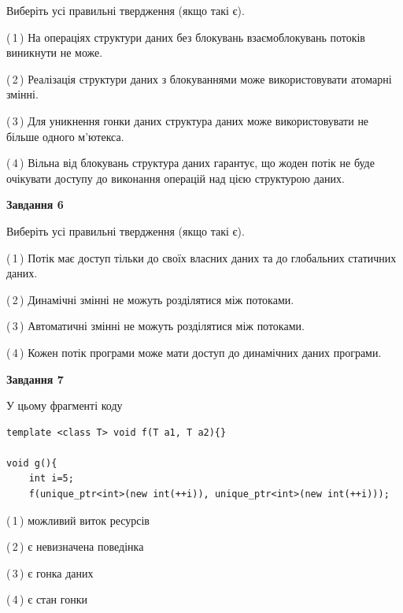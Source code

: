 \documentclass[12pt, ukrainian]{article}
\begin{document}
\begin {large}
{Виберіть усі правильні твердження (якщо такі є).\par
\vspace{2mm}

(\,1\,) На операціях структури даних без блокувань взаємоблокувань потоків виникнути не може.%

(\,2\,) Реалізація структури даних з блокуваннями може використовувати атомарні змінні.%

(\,3\,) Для уникнення гонки даних структура даних може використовувати не більше одного м’ютекса.%

(\,4\,) Вільна від блокувань структура даних гарантує, що жоден потік не буде очікувати доступу до виконання операцій над цією структурою даних.%
\newpage


\begin{center}
\textbf{Завдання 6}
\end{center}

Виберіть усі правильні твердження (якщо такі є).\par
\vspace{2mm}

(\,1\,) Потік має доступ тільки до своїх власних даних та до глобальних статичних даних.%

(\,2\,) Динамічні змінні не можуть розділятися між потоками.%

(\,3\,) Автоматичні змінні не можуть розділятися між потоками.%

(\,4\,) Кожен потік програми може мати доступ до динамічних даних програми.%


\begin{center}
\textbf{Завдання 7}
\end{center}

У цьому фрагменті коду
\begin{verbatim}
template <class T> void f(T a1, T a2){}

void g(){
    int i=5;
    f(unique_ptr<int>(new int(++i)), unique_ptr<int>(new int(++i)));
\end{verbatim}

(\,1\,) можливий виток ресурсів%

(\,2\,) є невизначена поведінка%

(\,3\,) є гонка даних%

(\,4\,) є стан гонки%

}
\end {large}

\vspace{4mm}
\newpage
\end{document}
